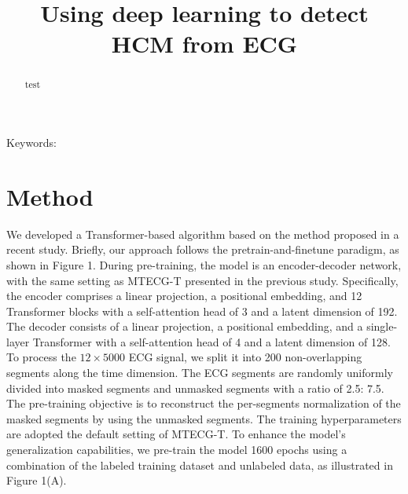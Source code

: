\documentclass[11pt]{article}
\title{Using deep learning to detect HCM from ECG}
\date{}
\theoremstyle{definition}
\begin{document}
\maketitle


\begin{abstract}
test
\end{abstract}
Keywords: 

\section{Method}
\label{sec:method}

We developed a Transformer-based algorithm based on the method proposed in a recent study. Briefly,  our approach follows the pretrain-and-finetune paradigm, as shown in Figure 1. During pre-training, the model is an encoder-decoder network, with the same setting as MTECG-T presented in the previous study. Specifically, the encoder comprises a linear projection, a positional embedding, and 12 Transformer blocks with a self-attention head of 3 and a latent dimension of 192. The decoder consists of a linear projection, a positional embedding, and a single-layer Transformer with a self-attention head of 4 and a latent dimension of 128. To process the $12 \times 5000$ ECG signal, we split it into 200 non-overlapping segments along the time dimension. The ECG segments are randomly uniformly divided into masked segments and unmasked segments with a ratio of 2.5: 7.5. 
The pre-training objective is to reconstruct the per-segments normalization of the masked segments by using the unmasked segments.  The training hyperparameters are adopted the default setting of MTECG-T. 
 To enhance the model's generalization capabilities, we pre-train the model 1600 epochs using a combination of the labeled training dataset and unlabeled data, as illustrated in Figure 1(A).


%
\end{document}
